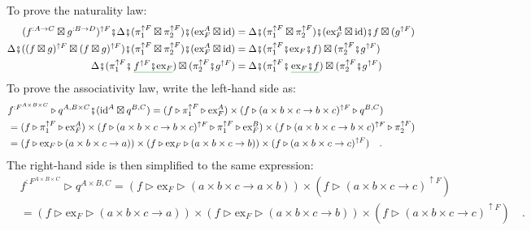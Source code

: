 To prove the naturality law:
\begin{align*}
(f^{:A\rightarrow C}\boxtimes g^{:B\rightarrow D})^{\uparrow F}\bef\Delta\bef(\pi_{1}^{\uparrow F}\boxtimes\pi_{2}^{\uparrow F})\bef(\text{ex}_{F}^{A}\boxtimes\text{id}) & =\Delta\bef(\pi_{1}^{\uparrow F}\boxtimes\pi_{2}^{\uparrow F})\bef(\text{ex}_{F}^{A}\boxtimes\text{id})\bef f\boxtimes(g^{\uparrow F})\\
\Delta\bef((f\boxtimes g)^{\uparrow F}\boxtimes(f\boxtimes g)^{\uparrow F})\bef(\pi_{1}^{\uparrow F}\boxtimes\pi_{2}^{\uparrow F})\bef(\text{ex}_{F}^{A}\boxtimes\text{id}) & =\Delta\bef(\pi_{1}^{\uparrow F}\bef\text{ex}_{F}\bef f)\boxtimes(\pi_{2}^{\uparrow F}\bef g^{\uparrow F})\\
\Delta\bef(\pi_{1}^{\uparrow F}\bef\,\gunderline{f^{\uparrow F}\bef\text{ex}_{F}})\boxtimes(\pi_{2}^{\uparrow F}\bef g^{\uparrow F}) & =\Delta\bef(\pi_{1}^{\uparrow F}\bef\,\gunderline{\text{ex}_{F}\bef f})\boxtimes(\pi_{2}^{\uparrow F}\bef g^{\uparrow F})
\end{align*}
To prove the associativity law, write the left-hand side as:
\begin{align*}
 & f^{:F^{A\times B\times C}}\triangleright q^{A,B\times C}\bef(\text{id}^{A}\boxtimes q^{B,C})=(f\triangleright\pi_{1}^{\uparrow F}\triangleright\text{ex}_{F}^{A})\times(f\triangleright(a\times b\times c\rightarrow b\times c)^{\uparrow F}\triangleright q^{B,C})\\
 & =(f\triangleright\pi_{1}^{\uparrow F}\triangleright\text{ex}_{F}^{A})\times(f\triangleright(a\times b\times c\rightarrow b\times c)^{\uparrow F}\triangleright\pi_{1}^{\uparrow F}\triangleright\text{ex}_{F}^{B})\times(f\triangleright(a\times b\times c\rightarrow b\times c)^{\uparrow F}\triangleright\pi_{2}^{\uparrow F})\\
 & =\left(f\triangleright\text{ex}_{F}\triangleright(a\times b\times c\rightarrow a)\right)\times\left(f\triangleright\text{ex}_{F}\triangleright(a\times b\times c\rightarrow b)\right)\times(f\triangleright(a\times b\times c\rightarrow c)^{\uparrow F})\quad.
\end{align*}
The right-hand side is then simplified to the same expression:
\begin{align*}
 & f^{:F^{A\times B\times C}}\triangleright q^{A\times B,C}=(f\triangleright\text{ex}_{F}\triangleright(a\times b\times c\rightarrow a\times b))\times(f\triangleright(a\times b\times c\rightarrow c)^{\uparrow F})\\
 & =\left(f\triangleright\text{ex}_{F}\triangleright(a\times b\times c\rightarrow a)\right)\times\left(f\triangleright\text{ex}_{F}\triangleright(a\times b\times c\rightarrow b)\right)\times(f\triangleright(a\times b\times c\rightarrow c)^{\uparrow F})\quad.
\end{align*}



